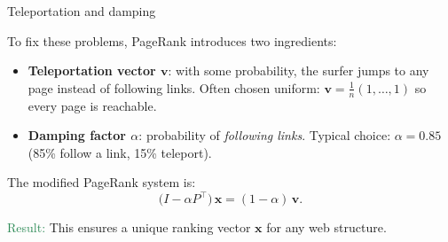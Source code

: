 \documentclass{beamer}
\begin{document}
\begin{frame}{Teleportation and damping}

To fix these problems, PageRank introduces two ingredients:

\begin{itemize}
\item \textbf{Teleportation vector \(\mathbf{v}\)}: with some probability, the surfer jumps to any page instead of following links.  
Often chosen uniform: $\mathbf{v}=\tfrac{1}{n}(1,\dots,1)$ so every page is reachable.

\item \textbf{Damping factor \(\alpha\)}: probability of \emph{following links}.  
Typical choice: $\alpha=0.85$ (85\% follow a link, 15\% teleport).

\end{itemize}

The modified PageRank system is:
\[
\big(I - \alpha P^{\top}\big)\,\mathbf{x} = (1-\alpha)\,\mathbf{v}.
\]

\medskip
\textcolor{SeaGreen}{Result:} This ensures a unique ranking vector $\mathbf{x}$ for any web structure.
\end{frame}

%
%
\end{document}
